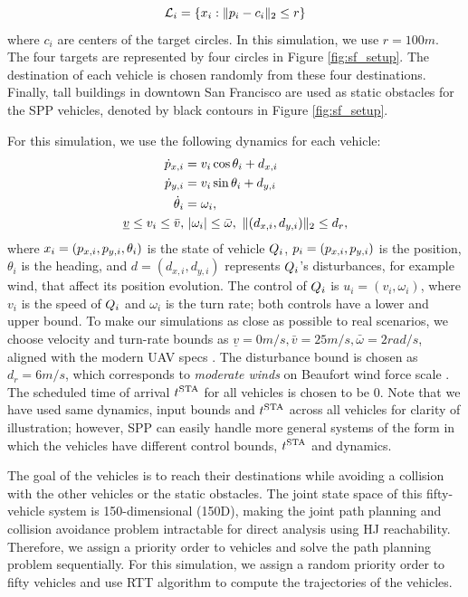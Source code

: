 \begin{equation}
\label{eq:target_sim}
\targetset_i = \{\state_i: \|\pos_i - c_i\|_2 \le r\}
\end{equation}
\noindent where $c_i$ are centers of the target circles. In this simulation, we use $r = 100m$. The four targets are represented by four circles in Figure \ref{fig:sf_setup}. The destination of each vehicle is chosen randomly from these four destinations. Finally, tall buildings in downtown San Francisco are used as static obstacles for the SPP vehicles, denoted by black contours in Figure \ref{fig:sf_setup}.

For this simulation, we use the following dynamics for each vehicle:
\begin{equation}
\label{eq:dyn_i}
\begin{aligned}
\dot{\pos}_{x,i} &= v_i \cos \theta_i + d_{x,i} \\
\dot{\pos}_{y,i} &= v_i \sin \theta_i + d_{y,i}\\
\dot{\theta}_i &= \omega_i, \\
\underline{v} \le v_i \le \bar{v}, & ~|\omega_i| \le \bar{\omega}, ~\|(d_{x,i}, d_{y,i}) \|_2 \le d_{r},
\end{aligned}
\end{equation}
\noindent where $x_i = (p_{x,i}, p_{y,i}, \theta_i)$ is the state of vehicle $Q_i$, $p_i = (p_{x,i}, p_{y,i})$ is the position, $\theta_i$ is the heading, and $d = (d_{x,i}, d_{y,i})$ represents $Q_i$'s disturbances, for example wind, that affect its position evolution. The control of $Q_i$ is $u_i = (v_i, \omega_i)$, where $v_i$ is the speed of $Q_i$ and $\omega_i$ is the turn rate; both controls have a lower and upper bound. To make our simulations as close as possible to real scenarios, we choose velocity and turn-rate bounds as $\underline{v} = 0m/s, \bar{v} = 25m/s, \bar\omega = 2 rad/s$, aligned with the modern UAV specs \cite{UAVspecs1, UAVspecs2}. The disturbance bound is chosen as $d_{r} = 6 m/s$, which corresponds to \textit{moderate winds} on Beaufort wind force scale \cite{Windscale}. The scheduled time of arrival $t^\text{STA}$ for all vehicles is chosen to be $0$. Note that we have used same dynamics, input bounds and $t^\text{STA}$ across all vehicles for clarity of illustration; however, SPP can easily handle more general systems of the form in which the vehicles have different control bounds, $t^\text{STA}$ and dynamics.

The goal of the vehicles is to reach their destinations while avoiding a collision with the other vehicles or the static obstacles. The joint state space of this fifty-vehicle system is 150-dimensional (150D), making the joint path planning and collision avoidance problem intractable for direct analysis using HJ reachability. Therefore, we assign a priority order to vehicles and solve the path planning problem sequentially. For this simulation, we assign a random priority order to fifty vehicles and use RTT algorithm to compute the trajectories of the vehicles. 